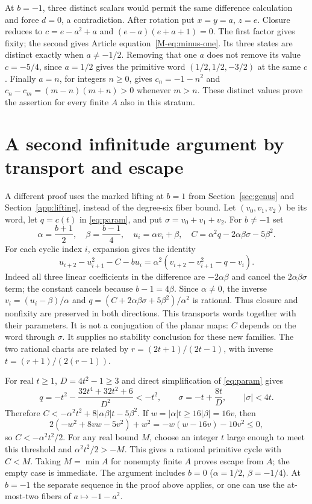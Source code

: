 \documentclass{jT}
\begin{document}
At $b=-1$, three distinct scalars would permit the same difference calculation and force $d=0$, a contradiction. After rotation put $x=y=a$, $z=e$. Closure reduces to $c=e-a^2+a$ and $(e-a)(e+a+1)=0$. The first factor gives fixity; the second gives Article equation~\eqref{M-eq:minus-one}. Its three states are distinct exactly when $a\ne-1/2$. Removing that one $a$ does not remove its value $c=-5/4$, since $a=1/2$ gives the primitive word $(1/2,1/2,-3/2)$ at the same $c$. Finally $a=n$, for integers $n\ge0$, gives $c_n=-1-n^2$ and $c_n-c_m=(m-n)(m+n)>0$ whenever $m>n$. These distinct values prove the assertion for every finite $A$ also in this stratum.

\section{A second infinitude argument by transport and escape}\label{sec:transport}
A different proof uses the marked lifting at $b=1$ from Section~\ref{sec:genus} and Section~\ref{app:lifting}, instead of the degree-six fiber bound. Let $(v_0,v_1,v_2)$ be its word, let $q=c(t)$ in \eqref{eq:param}, and put $\sigma=v_0+v_1+v_2$. For $b\ne-1$ set
\begin{equation}\label{eq:transport}
\alpha=\frac{b+1}{2},\quad \beta=\frac{b-1}{4},\quad
u_i=\alpha v_i+\beta,\quad C=\alpha^2q-2\alpha\beta\sigma-5\beta^2.
\end{equation}
For each cyclic index $i$, expansion gives the identity
\[
u_{i+2}-u_{i+1}^2-C-bu_i
=\alpha^2(v_{i+2}-v_{i+1}^2-q-v_i).
\]
Indeed all three linear coefficients in the difference are $-2\alpha\beta$ and cancel the $2\alpha\beta\sigma$ term; the constant cancels because $b-1=4\beta$. Since $\alpha\ne0$, the inverse $v_i=(u_i-\beta)/\alpha$ and $q=(C+2\alpha\beta\sigma+5\beta^2)/\alpha^2$ is rational. Thus closure and nonfixity are preserved in both directions. This transports words together with their parameters. It is not a conjugation of the planar maps: $C$ depends on the word through $\sigma$. It supplies no stability conclusion for these new families. The two rational charts are related by $r=(2t+1)/(2t-1)$, with inverse $t=(r+1)/(2(r-1))$.

For real $t\ge1$, $D=4t^2-1\ge3$ and direct simplification of \eqref{eq:param} gives
\[
q=-t^2-\frac{32t^4+32t^2+6}{D^2}<-t^2,\qquad
\sigma=-t+\frac{8t}{D},\qquad |\sigma|<4t.
\]
Therefore $C<-\alpha^2t^2+8|\alpha\beta|t-5\beta^2$. If $w=|\alpha|t\ge16|\beta|=16v$, then
\[
2(-w^2+8vw-5v^2)+w^2=-w(w-16v)-10v^2\le0,
\]
so $C<-\alpha^2t^2/2$. For any real bound $M$, choose an integer $t$ large enough to meet this threshold and $\alpha^2t^2/2>-M$. This gives a rational primitive cycle with $C<M$. Taking $M=\min A$ for nonempty finite $A$ proves escape from $A$; the empty case is immediate. The argument includes $b=0$ ($\alpha=1/2$, $\beta=-1/4$). At $b=-1$ the separate sequence in the proof above applies, or one can use the at-most-two fibers of $a\mapsto-1-a^2$.
\end{document}
